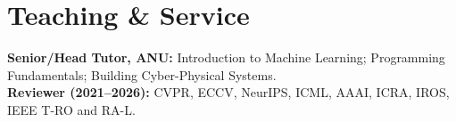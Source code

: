 \section{Teaching \& Service}

{\small
\textbf{Senior/Head Tutor, ANU:} Introduction to Machine Learning; Programming Fundamentals; Building Cyber-Physical Systems.\\
\textbf{Reviewer (2021--2026):} CVPR, ECCV, NeurIPS, ICML, AAAI, ICRA, IROS, IEEE T-RO and RA-L.
}
